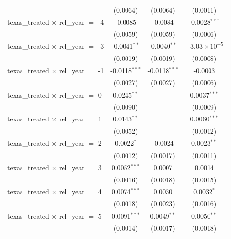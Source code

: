 \begin{tabular}{lccc}
                                                & (0.0064)        & (0.0064)        & (0.0011)\\   
   texas\_treated $\times$ rel\_year $=$ -4     & -0.0085         & -0.0084         & -0.0028$^{***}$\\   
                                                & (0.0059)        & (0.0059)        & (0.0006)\\   
   texas\_treated $\times$ rel\_year $=$ -3     & -0.0041$^{**}$  & -0.0040$^{**}$  & $-3.03\times 10^{-5}$\\    
                                                & (0.0019)        & (0.0019)        & (0.0008)\\   
   texas\_treated $\times$ rel\_year $=$ -1     & -0.0118$^{***}$ & -0.0118$^{***}$ & -0.0003\\   
                                                & (0.0027)        & (0.0027)        & (0.0006)\\   
   texas\_treated $\times$ rel\_year $=$ 0      & 0.0245$^{**}$   &                 & 0.0037$^{***}$\\   
                                                & (0.0090)        &                 & (0.0009)\\   
   texas\_treated $\times$ rel\_year $=$ 1      & 0.0143$^{**}$   &                 & 0.0060$^{***}$\\   
                                                & (0.0052)        &                 & (0.0012)\\   
   texas\_treated $\times$ rel\_year $=$ 2      & 0.0022$^{*}$    & -0.0024         & 0.0023$^{**}$\\   
                                                & (0.0012)        & (0.0017)        & (0.0011)\\   
   texas\_treated $\times$ rel\_year $=$ 3      & 0.0052$^{***}$  & 0.0007          & 0.0014\\   
                                                & (0.0016)        & (0.0018)        & (0.0015)\\   
   texas\_treated $\times$ rel\_year $=$ 4      & 0.0074$^{***}$  & 0.0030          & 0.0032$^{*}$\\   
                                                & (0.0018)        & (0.0023)        & (0.0016)\\   
   texas\_treated $\times$ rel\_year $=$ 5      & 0.0091$^{***}$  & 0.0049$^{**}$   & 0.0050$^{**}$\\   
                                                & (0.0014)        & (0.0017)        & (0.0018)\\   

\end{tabular}
